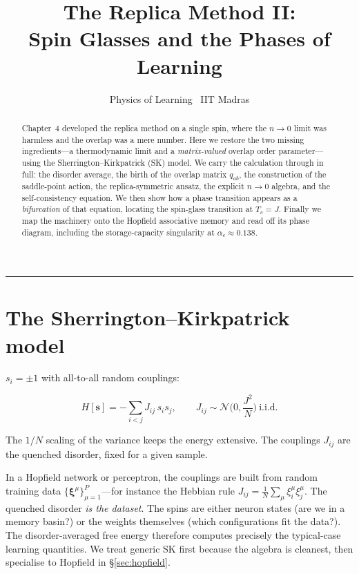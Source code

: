 \documentclass[nobib,justified]{tufte-handout}
\title{The Replica Method II:\\ Spin Glasses and the Phases of Learning}
\author{Physics of Learning \textbullet\ IIT Madras}
\date{}
\begin{document}
\maketitle
{}\vspace{4pt}\hrule\vspace{10pt}

\begin{abstract}
\noindent
Chapter~4 developed the replica method on a single spin, where the
$n\to0$ limit was harmless and the overlap was a mere number. Here we
restore the two missing ingredients---a thermodynamic limit and a
\emph{matrix-valued} overlap order parameter---using the
Sherrington--Kirkpatrick (SK) model. We carry the calculation through in
full: the disorder average, the birth of the overlap matrix $q_{ab}$, the
construction of the saddle-point action, the replica-symmetric ansatz, the
explicit $n\to0$ algebra, and the self-consistency equation. We then show
how a phase transition appears as a \emph{bifurcation} of that equation,
locating the spin-glass transition at $T_c=J$. Finally we map the
machinery onto the Hopfield associative memory and read off its phase
diagram, including the storage-capacity singularity at
$\alpha_c\approx0.138$.
\end{abstract}

\section{The Sherrington--Kirkpatrick model}

 $s_i=\pm1$ with all-to-all random couplings:
\begin{keyresult}
\[
  H[\mathbf s] = -\sum_{i<j} J_{ij}\, s_i s_j,
  \qquad J_{ij}\sim\mathcal N\!\Big(0,\frac{J^2}{N}\Big)\ \text{i.i.d.}
\]
\end{keyresult}
\noindent
The $1/N$ scaling of the variance keeps the energy
extensive. The couplings $J_{ij}$ are
the quenched disorder, fixed for a given sample.

\label{sec:why}
In a Hopfield network or perceptron, the couplings are built from random
training data $\{\boldsymbol\xi^\mu\}_{\mu=1}^P$---for instance the Hebbian
rule $J_{ij}=\frac1N\sum_\mu \xi_i^\mu\xi_j^\mu$. The quenched disorder
\emph{is the dataset}. The spins are either neuron states (are we in a
memory basin?) or the weights themselves (which configurations fit the
data?). The disorder-averaged free energy therefore computes precisely the
typical-case learning quantities. We treat generic SK first because the
algebra is cleanest, then specialise to Hopfield in
\S\ref{sec:hopfield}.
\end{document}
